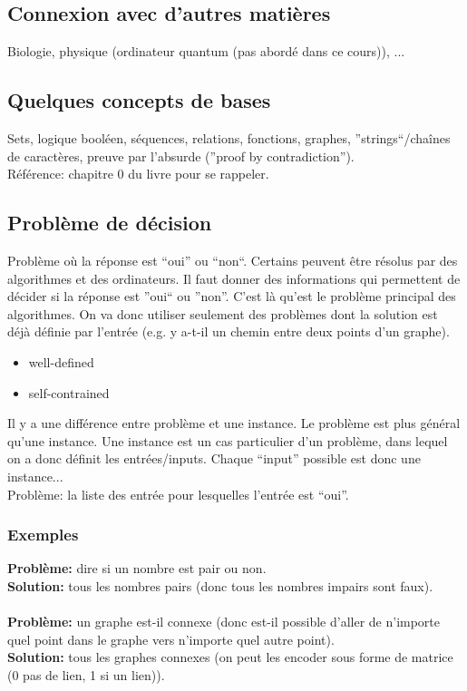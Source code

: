 \documentclass[a4paper,12pt]{article}
\begin{document}
  \subsection{Connexion avec d'autres matières}
    Biologie, physique (ordinateur quantum (pas abordé dans ce cours)), ...

  \subsection{Quelques concepts de bases}
    Sets, logique booléen, séquences, relations, fonctions, graphes, ''strings``/chaînes de caractères, preuve par l'absurde (''proof by contradiction'').\\
    Référence: chapitre 0 du livre pour se rappeler.

  \subsection{Problème de décision}
    Problème où la réponse est ``oui'' ou ``non``.  Certains peuvent être résolus par des algorithmes et des ordinateurs.  Il faut donner des informations qui permettent de décider si la réponse est ''oui`` ou ''non''.  C'est là qu'est le problème principal des algorithmes.  On va donc utiliser seulement des problèmes dont la solution est déjà définie par l'entrée (e.g. y a-t-il un chemin entre deux points d'un graphe).\\
    \begin{itemize}
     \item well-defined
     \item self-contrained
    \end{itemize}
    Il y a une différence entre problème et une instance.  Le problème est plus général qu'une instance.  Une instance est un cas particulier d'un problème, dans lequel on a donc définit les entrées/inputs.  Chaque ``input'' possible est donc une instance...\\
    Problème: la liste des entrée pour lesquelles l'entrée est ``oui''.

    \subsubsection{Exemples}
      \textbf{Problème:} dire si un nombre est pair ou non.\\
      \textbf{Solution:} tous les nombres pairs (donc tous les nombres impairs sont faux).\\
      \\
      \textbf{Problème:} un graphe est-il connexe (donc est-il possible d'aller de n'importe quel point dans le graphe vers n'importe quel autre point).\\
      \textbf{Solution:} tous les graphes connexes (on peut les encoder sous forme de matrice (0 pas de lien, 1 si un lien)).
\end{document}

